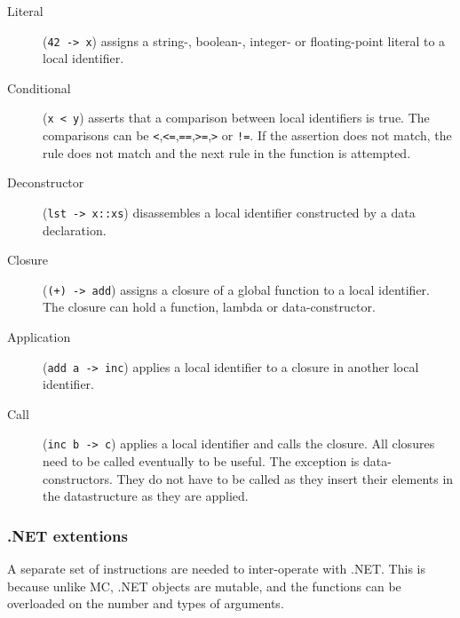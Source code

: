 \begin{description}
\item[Literal] (\verb|42 -> x|) assigns a string-, boolean-, integer- or floating-point literal to a local identifier.
\item[Conditional] (\verb|x < y|) asserts that a comparison between local identifiers is true.
    The comparisons can be \verb|<|,\verb|<=|,\verb|==|,\verb|>=|,\verb|>| or \verb|!=|.
    If the assertion does not match, the rule does not match and the next rule in the function is attempted.
\item[Deconstructor] (\verb|lst -> x::xs|) disassembles a local identifier constructed by a data declaration.
\item[Closure] (\verb|(+) -> add|) assigns a closure of a global function to a local identifier.
    The closure can hold a function, lambda or data-constructor.
\item[Application] (\verb|add a -> inc|) applies a local identifier to a closure in another local identifier.
\item[Call] (\verb|inc b -> c|) applies a local identifier and calls the closure.
    All closures need to be called eventually to be useful.
    The exception is data-constructors. 
    They do not have to be called as they insert their elements in the datastructure as they are applied.
\end{description}

\subsubsection{.NET extentions}
A separate set of instructions are needed to inter-operate with .NET.
This is because unlike MC, .NET objects are mutable, and the functions can be overloaded on the number and types of arguments.

